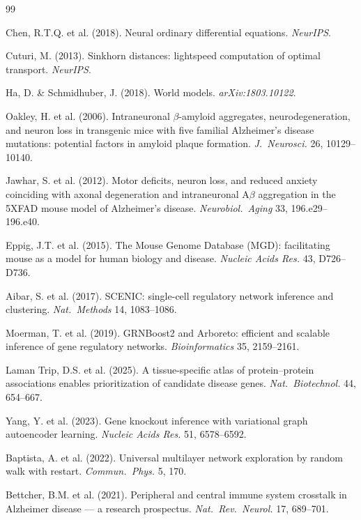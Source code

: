 \documentclass[12pt,a4paper]{article}
\begin{document}
\begin{thebibliography}{99}

 Chen, R.T.Q. et al. (2018). Neural ordinary differential equations. \textit{NeurIPS}.

 Cuturi, M. (2013). Sinkhorn distances: lightspeed computation of optimal transport. \textit{NeurIPS}.

 Ha, D. \& Schmidhuber, J. (2018). World models. \textit{arXiv:1803.10122}.

 Oakley, H. et al. (2006). Intraneuronal $\beta$-amyloid aggregates, neurodegeneration, and neuron loss in transgenic mice with five familial Alzheimer's disease mutations: potential factors in amyloid plaque formation. \textit{J.\ Neurosci.} 26, 10129--10140.

 Jawhar, S. et al. (2012). Motor deficits, neuron loss, and reduced anxiety coinciding with axonal degeneration and intraneuronal A$\beta$ aggregation in the 5XFAD mouse model of Alzheimer's disease. \textit{Neurobiol.\ Aging} 33, 196.e29--196.e40.

 Eppig, J.T. et al. (2015). The Mouse Genome Database (MGD): facilitating mouse as a model for human biology and disease. \textit{Nucleic Acids Res.} 43, D726--D736.

 Aibar, S. et al. (2017). SCENIC: single-cell regulatory network inference and clustering. \textit{Nat.\ Methods} 14, 1083--1086.

 Moerman, T. et al. (2019). GRNBoost2 and Arboreto: efficient and scalable inference of gene regulatory networks. \textit{Bioinformatics} 35, 2159--2161.

 Laman Trip, D.S. et al. (2025). A tissue-specific atlas of protein--protein associations enables prioritization of candidate disease genes. \textit{Nat.\ Biotechnol.} 44, 654--667.

 Yang, Y. et al. (2023). Gene knockout inference with variational graph autoencoder learning. \textit{Nucleic Acids Res.} 51, 6578--6592.

 Baptista, A. et al. (2022). Universal multilayer network exploration by random walk with restart. \textit{Commun.\ Phys.} 5, 170.

 Bettcher, B.M. et al. (2021). Peripheral and central immune system crosstalk in Alzheimer disease --- a research prospectus. \textit{Nat.\ Rev.\ Neurol.} 17, 689--701.


\end{thebibliography}
\end{document}
